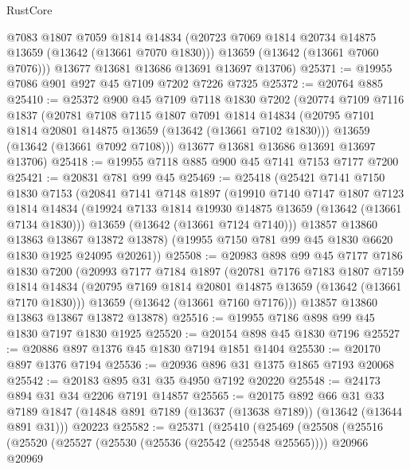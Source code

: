 \begin{lexlean}{RustCore}
\begin{coremodule}
        @7083
        @1807
        @7059
        @1814
        @14834
        (@20723 @7069 @1814 @20734 @14875 @13659 (@13642 (@13661 @7070 @1830)))
        @13659
        (@13642 (@13661 @7060 @7076)))
      @13677
      @13681
      @13686
      @13691
      @13697
      @13706)
@25371 := @19955 @7086 @901 @927 @45 @7109 @7202 @7226 @7325
@25372 := @20764 @885
@25410 := @25372
    @900
    @45
    @7109
    @7118
    @1830
    @7202
    (@20774
      @7109
      @7116
      @1837
      (@20781
        @7108
        @7115
        @1807
        @7091
        @1814
        @14834
        (@20795 @7101 @1814 @20801 @14875 @13659 (@13642 (@13661 @7102 @1830)))
        @13659
        (@13642 (@13661 @7092 @7108)))
      @13677
      @13681
      @13686
      @13691
      @13697
      @13706)
@25418 := @19955 @7118 @885 @900 @45 @7141 @7153 @7177 @7200
@25421 := @20831 @781 @99 @45
@25469 := @25418
    (@25421
      @7141
      @7150
      @1830
      @7153
      (@20841
        @7141
        @7148
        @1897
        (@19910
          @7140
          @7147
          @1807
          @7123
          @1814
          @14834
          (@19924 @7133 @1814 @19930 @14875 @13659 (@13642 (@13661 @7134 @1830)))
          @13659
          (@13642 (@13661 @7124 @7140)))
        @13857
        @13860
        @13863
        @13867
        @13872
        @13878)
      (@19955 @7150 @781 @99 @45 @1830 @6620 @1830 @1925 @24095 @20261))
@25508 := @20983
    @898
    @99
    @45
    @7177
    @7186
    @1830
    @7200
    (@20993
      @7177
      @7184
      @1897
      (@20781
        @7176
        @7183
        @1807
        @7159
        @1814
        @14834
        (@20795 @7169 @1814 @20801 @14875 @13659 (@13642 (@13661 @7170 @1830)))
        @13659
        (@13642 (@13661 @7160 @7176)))
      @13857
      @13860
      @13863
      @13867
      @13872
      @13878)
@25516 := @19955 @7186 @898 @99 @45 @1830 @7197 @1830 @1925
@25520 := @20154 @898 @45 @1830 @7196
@25527 := @20886 @897 @1376 @45 @1830 @7194 @1851 @1404
@25530 := @20170 @897 @1376 @7194
@25536 := @20936 @896 @31 @1375 @1865 @7193 @20068
@25542 := @20183 @895 @31 @35 @4950 @7192 @20220
@25548 := @24173 @894 @31 @34 @2206 @7191 @14857
@25565 := @20175
    @892
    @66
    @31
    @33
    @7189
    @1847
    (@14848 @891 @7189 (@13637 (@13638 @7189)) (@13642 (@13644 @891 @31)))
    @20223
@25582 := @25371
    (@25410
      (@25469
        (@25508
          (@25516
            (@25520
              (@25527
                (@25530 (@25536 (@25542 (@25548 @25565))))
                @20966
                @20969

\end{coremodule}
\end{lexlean}
